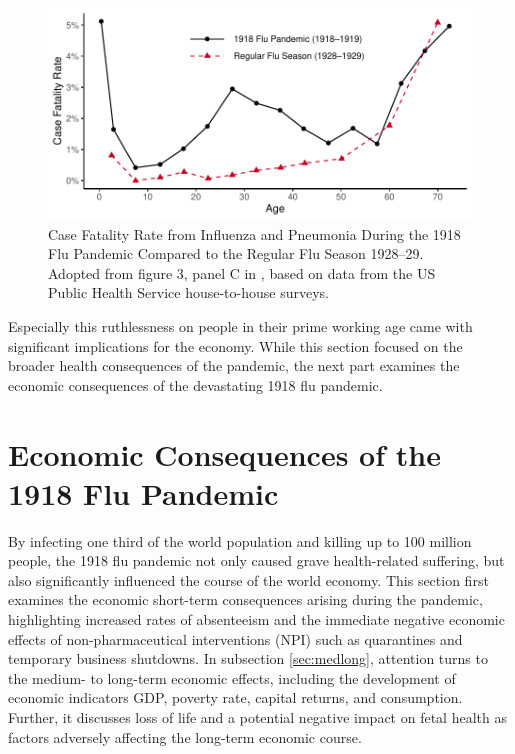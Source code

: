 \documentclass[12pt,a4paper]{article}
\begin{document}
\begin{figure}[ht]
	\centering
	\includegraphics[]{plots/cfr.pdf}
	\caption[Case Fatality Rate from Influenza and Pneumonia During the 1918 Flu Pandemic Compared to the Regular Flu Season 1928--29]{Case Fatality Rate from Influenza and Pneumonia During the 1918 Flu Pandemic Compared to the Regular Flu Season 1928--29.
	Adopted from figure 3, panel C in \cite{taubenberger1918InfluenzaMother2006}, based on data from the US Public Health Service
	house-to-house surveys.}
	\label{fig_cfr}
\end{figure}

Especially this ruthlessness on people in their prime working age came with significant implications for the economy.
While this section focused on the broader health consequences of the pandemic, the next part examines the economic consequences of the devastating 1918 flu pandemic.

\section{Economic Consequences of the 1918 Flu Pandemic}

By infecting one third of the world population and killing up to 100 million people, the 1918 flu pandemic not only caused grave health-related suffering, but also significantly influenced the course of the world economy.
This section first examines the economic short-term consequences arising during the pandemic, highlighting increased rates of absenteeism and the immediate negative economic effects of non-pharmaceutical interventions (NPI) such as quarantines and temporary business shutdowns.
In subsection \ref{sec:medlong}, attention turns to the medium- to long-term economic effects, including the development of economic indicators GDP, poverty rate, capital returns, and consumption. 
Further, it discusses loss of life and a potential negative impact on fetal health as factors adversely affecting the long-term economic course.
\end{document}
